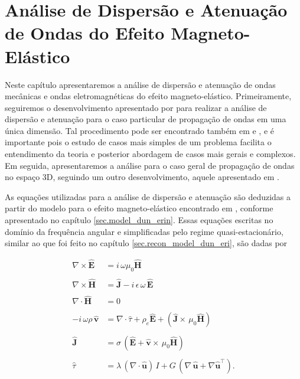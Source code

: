 \chapter{An\'alise de Dispers\~ao e Atenua\c{c}\~ao de Ondas do Efeito Magneto-El\'astico}\label{sec.disp_aten_mag_elastico}

Neste cap\'itulo apresentaremos a an\'alise de dispers\~ao e atenua\c{c}\~ao de ondas mec\^anicas e ondas eletromagn\'eticas do efeito magneto-el\'astico. Primeiramente, seguiremos o desenvolvimento apresentado por \cite{Blanc_13} para realizar a an\'alise de dispers\~ao e atenua\c{c}\~ao para o caso particular de propaga\c{c}\~ao de ondas em uma \'unica dimens\~ao. Tal procedimento pode ser encontrado tamb\'em em \cite{oliveira_2018} e \cite{miranda_2016}, e \'e importante pois o estudo de casos mais simples de um problema facilita o entendimento da teoria e posterior abordagem de casos mais gerais e complexos. Em seguida, apresentaremos a an\'alise para o caso geral de propaga\c{c}\~ao de ondas no espa\c{c}o 3D, seguindo um outro desenvolvimento, aquele apresentado em \cite{sharma_08}.


As equa\c{c}\~oes utilizadas para a an\'alise de dispers\~ao e atenua\c{c}\~ao s\~ao deduzidas a partir do modelo para o efeito magneto-el\'astico encontrado em \cite{eringen_1963}, conforme apresentado no cap\'itulo \ref{sec.model_dun_erin}. Essas equa\c{c}\~oes escritas no dom\'inio da frequ\^encia angular e simplificadas pelo regime quasi-estacion\'ario, similar ao que foi feito no cap\'itulo \ref{sec.recon_model_dun_eri}, s\~ao dadas por 


\begin{align}\label{eq.faraday}
\nabla\times\mathbf{\widehat{E}}&=i\,\omega\mu_0\mathbf{\widehat{H}}\\\nonumber\\\label{eq.ampere}
\nabla\times\mathbf{\widehat{H}}&=\mathbf{\widehat{J}}-i\,\epsilon\,\omega\,\mathbf{\widehat{E}}\\\nonumber\\\label{eq.div_B}
\nabla\cdot\mathbf{\widehat{H}}&=0\\\nonumber\\\label{eq.equi_couchy}
-i\,\omega\rho\,\mathbf{\widehat{v}}&=\nabla\cdot\widehat{\tau}+\rho_e\mathbf{\widehat{E}}+(\mathbf{\widehat{J}}\times\,\mu_0\mathbf{\widehat{H}})\\\nonumber\\\label{eq.dens_fluxo_ele}
\mathbf{\widehat{J}}&=\sigma\,(\mathbf{\widehat{E}}+\mathbf{\widehat{v}}\times\,\mu_0\mathbf{\widehat{H}})\\\nonumber\\\label{eq.Lame}
\widehat{\tau}&=\lambda\,(\nabla\cdot\mathbf{\widehat{u}})\,I + G\,(\nabla\,\mathbf{\widehat{u}}+\nabla\mathbf{\widehat{u}}^\top).
\end{align}


